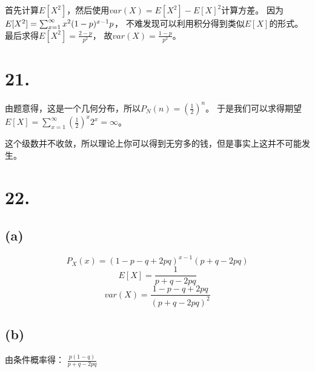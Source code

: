 \documentclass[UTF8]{report}
\begin{document}
        首先计算$E[X^2]$，然后使用$var(X) = E[X^2] - E[X]^2$计算方差。
        因为$\\E[X^2] = \sum_{x = 1}^{\infty}x^2(1 - p)^{x - 1}p$，
        不难发现可以利用积分得到类似$E[X]$的形式。最后求得$E[X^2] = \frac{2 - p}{p^2}$，
        故$var(X) = \frac{1 - p}{p^2}$。
    \section*{21.}
        由题意得，这是一个几何分布，所以$P_N(n) = (\frac{1}{2})^n$。
        于是我们可以求得期望$E[X] = \sum_{x = 1}^{\infty}(\frac{1}{2})^x2^x = \infty$。

        这个级数并不收敛，所以理论上你可以得到无穷多的钱，但是事实上这并不可能发生。
    \section*{22.}
        \subsection*{(a)}
            $$P_X(x) = (1 - p - q + 2pq)^{x - 1}(p + q - 2pq)$$
            $$E[X] = \frac{1}{p + q -2pq}$$
            $$var(X) = \frac{1 - p - q + 2pq}{(p + q - 2pq)^2}$$
        \subsection*{(b)}
            由条件概率得：
            $\frac{p(1 - q)}{p + q - 2pq}$
\end{document}
